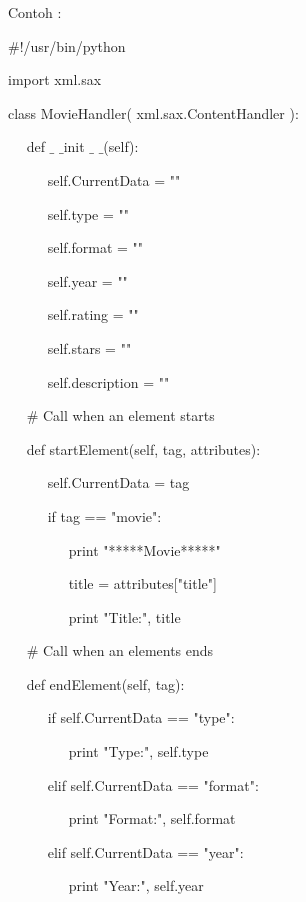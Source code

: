 \vspace{12pt}
\noindent 
Contoh : \par
\noindent 
 $  \#  $!/usr/bin/python \par
\vspace{12pt}
\noindent 
import xml.sax \par
\vspace{12pt}
\noindent 
class MovieHandler( xml.sax.ContentHandler ): \par
\noindent 
~~ def  $  \_  $ $  \_  $init $  \_  $ $  \_  $(self): \par
\noindent 
~~~~~ self.CurrentData = "" \par
\noindent 
~~~~~ self.type = "" \par
\noindent 
~~~~~ self.format = "" \par
\noindent 
~~~~~ self.year = "" \par
\noindent 
~~~~~ self.rating = "" \par
\noindent 
~~~~~ self.stars = "" \par
\noindent 
~~~~~ self.description = "" \par
\vspace{12pt}
\noindent 
~~  $  \#  $ Call when an element starts \par
\noindent 
~~ def startElement(self, tag, attributes): \par
\noindent 
~~~~~ self.CurrentData = tag \par
\noindent 
~~~~~ if tag == "movie": \par
\noindent 
~~~~~~~~ print "*****Movie*****" \par
\noindent 
~~~~~~~~ title = attributes["title"] \par
\noindent 
~~~~~~~~ print "Title:", title \par
\vspace{12pt}
\noindent 
~~  $  \#  $ Call when an elements ends \par
\noindent 
~~ def endElement(self, tag): \par
\noindent 
~~~~~ if self.CurrentData == "type": \par
\noindent 
~~~~~~~~ print "Type:", self.type \par
\noindent 
~~~~~ elif self.CurrentData == "format": \par
\noindent 
~~~~~~~~ print "Format:", self.format \par
\noindent 
~~~~~ elif self.CurrentData == "year": \par
\noindent 
~~~~~~~~ print "Year:", self.year \par
